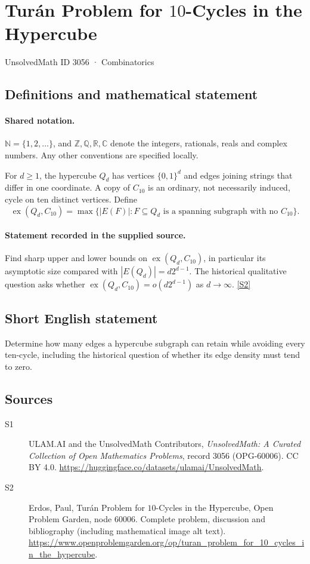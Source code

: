 \documentclass[11pt]{book}
\newcommand{\sref}[2]{\hyperlink{source:#1:#2}{[S#2]}}
\begin{document}
\setcounter{section}{3055}
\section{Turán Problem for $10$-Cycles in the Hypercube}\label{3056}
{\small\sffamily UnsolvedMath ID 3056 · Combinatorics}
\subsection{Definitions and mathematical statement}

\paragraph{Shared notation.}$\mathbb N=\{1,2,\ldots\}$, and $\mathbb Z,\mathbb Q,\mathbb R,\mathbb C$ denote the integers, rationals, reals and complex numbers. Any other conventions are specified locally.


For $d\geq1$, the hypercube $Q_d$ has vertices $\{0,1\}^d$ and edges joining strings that differ in one coordinate. A copy of $C_{10}$ is an ordinary, not necessarily induced, cycle on ten distinct vertices. Define
\[\operatorname{ex}(Q_d,C_{10})=\max\{|E(F)|:F\subseteq Q_d\text{ is a spanning subgraph with no }C_{10}\}.\]
\paragraph{Statement recorded in the supplied source.}
Find sharp upper and lower bounds on $\operatorname{ex}(Q_d,C_{10})$, in particular its asymptotic size compared with $|E(Q_d)|=d2^{d-1}$. The historical qualitative question asks whether $\operatorname{ex}(Q_d,C_{10})=o(d2^{d-1})$ as $d\to\infty$. \sref{3056}{2}
\subsection{Short English statement}
Determine how many edges a hypercube subgraph can retain while avoiding every ten-cycle, including the historical question of whether its edge density must tend to zero.
\subsection{Sources}
\begin{description}
\item[\hypertarget{source:3056:1}{S1}] ULAM.AI and the UnsolvedMath Contributors, \emph{UnsolvedMath: A Curated Collection of Open Mathematics Problems}, record 3056 (OPG-60006). CC BY 4.0. \url{https://huggingface.co/datasets/ulamai/UnsolvedMath}.
\item[\hypertarget{source:3056:2}{S2}] Erdos, Paul, Turán Problem for $10$-Cycles in the Hypercube, Open Problem Garden, node 60006. Complete problem, discussion and bibliography (including mathematical image alt text). \url{https://www.openproblemgarden.org/op/turan_problem_for_10_cycles_in_the_hypercube}.
\end{description}
\label{end:3056}
\end{document}

